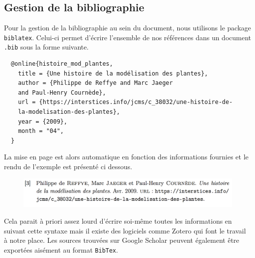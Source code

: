 \subsection{Gestion de la bibliographie}
Pour la gestion de la bibliographie au sein du document,
nous utilisons le package \texttt{biblatex}.
Celui-ci permet d'écrire l'ensemble de nos références dans un document \texttt{.bib}
sous la forme suivante.
\begin{verbatim}
  @online{histoire_mod_plantes,
    title = {Une histoire de la modélisation des plantes},
    author = {Philippe de Reffye and Marc Jaeger 
    and Paul-Henry Cournède},
    url = {https://interstices.info/jcms/c_38032/une-histoire-de-
    la-modelisation-des-plantes},
    year = {2009},
    month = "04",
  }
\end{verbatim}
La mise en page est alors automatique en fonction des informations fournies
et le rendu de l'exemple est présenté ci dessous.
\begin{figure}[h]
  \includegraphics[scale=0.6]{./img/rendu_elem_bib.jpg}
\end{figure}

Cela parait à priori assez lourd d'écrire soi-même toutes les informations
en suivant cette syntaxe mais il existe des logiciels comme Zotero
qui font le travail à notre place.
Les sources trouvées sur Google Scholar peuvent également être exportées
aisément au format \texttt{BibTex}.
